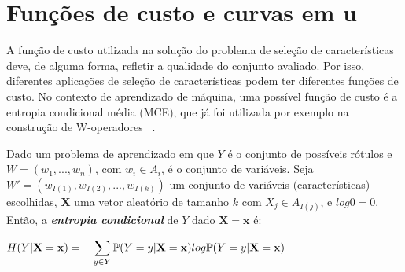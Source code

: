 



\section{Funções de custo e curvas em u} 
\label{fund_concept:cost_functions} A função de custo utilizada na 
solução do problema de seleção de características deve, de alguma forma,
refletir a qualidade do conjunto avaliado. Por isso, diferentes 
aplicações de seleção de características
podem ter diferentes funções de custo. No contexto de aprendizado de 
máquina, uma possível função de custo é a entropia condicional média
(MCE), que já foi utilizada por exemplo na construção de W-operadores
~\cite{MJCJB06}.

\begin{mydefinition}\label{def:conditional_entropy}
Dado um problema de aprendizado em que $Y$ é o conjunto de possíveis
rótulos e $W = (w_1, ..., w_n)$, com $w_i \in A_i$, é o conjunto de
variáveis. Seja $W' = (w_{I(1)}, w_{I(2)}, ..., w_{I(k)})$ um conjunto 
de variáveis (características) escolhidas, $\mathbf{X}$ uma vetor 
aleatório de tamanho $k$ com ${X_j} \in A_{I(j)}$, e $log0 = 0$. Então,
a {\bf \em entropia condicional} de $Y$ dado $\mathbf{X} = \mathbf x$ é:

\begin{center}
$
\begin{aligned}
H (Y | \mathbf{X = x}) = - 
\sum_{y \in Y} \mathbb{P} (Y = y | \mathbf{X = x}) log \mathbb{P} (Y = y | \mathbf{X = x})
\end{aligned}
$
\end{center}
\end{mydefinition}

